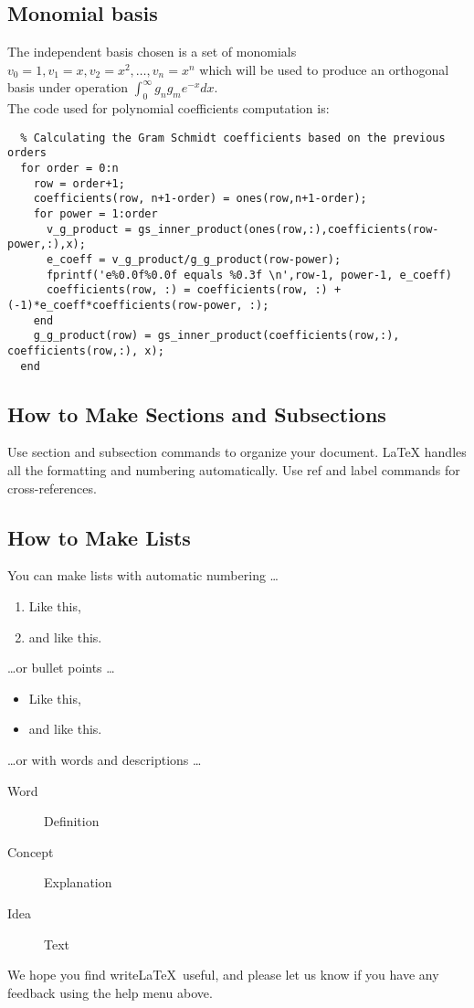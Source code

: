 \documentclass[a4paper, fleqn]{article}
\numberwithin{equation}{section}
\begin{document}
\subsection{Monomial basis}

The independent basis chosen is a set of monomials $v_0 = 1, v_1 = x, v_2 = x^2, \ldots, v_n=x^n$ which will be used to produce an orthogonal basis under operation $\int_{0}^{\infty} g_n g_m e^{-x} dx$.\\
The code used for polynomial coefficients computation is:

\begin{lstlisting}
  % Calculating the Gram Schmidt coefficients based on the previous orders
  for order = 0:n
    row = order+1;
    coefficients(row, n+1-order) = ones(row,n+1-order);
    for power = 1:order
      v_g_product = gs_inner_product(ones(row,:),coefficients(row-power,:),x);
      e_coeff = v_g_product/g_g_product(row-power);
      fprintf('e%0.0f%0.0f equals %0.3f \n',row-1, power-1, e_coeff)
      coefficients(row, :) = coefficients(row, :) + (-1)*e_coeff*coefficients(row-power, :);
    end
    g_g_product(row) = gs_inner_product(coefficients(row,:), coefficients(row,:), x);
  end
\end{lstlisting}

\subsection{How to Make Sections and Subsections}

Use section and subsection commands to organize your document. \LaTeX{} handles all the formatting and numbering automatically. Use ref and label commands for cross-references.

\subsection{How to Make Lists}

You can make lists with automatic numbering \dots

\begin{enumerate}
\item Like this,
\item and like this.
\end{enumerate}
\dots or bullet points \dots
\begin{itemize}
\item Like this,
\item and like this.
\end{itemize}
\dots or with words and descriptions \dots
\begin{description}
\item[Word] Definition
\item[Concept] Explanation
\item[Idea] Text
\end{description}

We hope you find write\LaTeX\ useful, and please let us know if you have any feedback using the help menu above.
\end{document}
